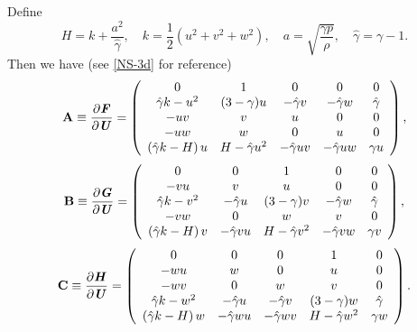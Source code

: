 \documentclass[review]{elsarticle}
\newcommand{\fr}{\frac}
\newcommand{\er}{\eqref}
\newcommand{\ga}{\gamma}
\newcommand{\bA}{\mathbf  A}
\newcommand{\bB}{\mathbf  B}
\newcommand{\bC}{\mathbf  C}
\newcommand{\pF}{\textbf{\emph{F}}}
\newcommand{\pG}{\textbf{\emph{G}}}
\newcommand{\pH}{\textbf{\emph{H}}}
\newcommand{\pU}{\textbf{\emph{U}}}
\newcommand{\pat}{\partial}
\begin{document}
Define
\begin{equation}\label{H-k-gamma-3d}
  H = k + \fr{a^2}{\hat \ga}, \quad
  k = \fr{1}{2} (u^2 + v^2 + w^2), \quad
  a = \sqrt{ \fr{\ga p}{\rho} }, \quad
  \hat \ga = \ga -1.
\end{equation}
Then we have (see \er{NS-3d} for reference)
\begin{equation}\label{A-3d}
  \bA \equiv \fr{\pat \pF}{\pat \pU} =
  \left(
    \begin{array}{ccccc}
      0 & 1 & 0 & 0 & 0 \\
      \hat \ga k - u^2 & (3-\ga) u & -\hat \ga v & -\hat \ga w & \hat \ga \\
      -uv & v & u & 0 & 0 \\
      -uw & w & 0 & u & 0 \\
      \left(\hat \ga k- H \right) u & H - \hat \ga u^2 & -\hat \ga uv & -\hat \ga uw & \ga u \\
    \end{array}
  \right),
\end{equation}
\begin{equation}\label{B-3d}
  \bB \equiv \fr{\pat \pG}{\pat \pU} =
  \left(
    \begin{array}{ccccc}
      0 & 0 & 1 & 0 & 0 \\
      -vu & v & u & 0 & 0 \\
      \hat \ga k - v^2 & -\hat \ga u & (3-\ga) v & -\hat \ga w & \hat \ga \\
      -vw & 0 & w & v & 0 \\
      \left(\hat \ga k- H \right) v & -\hat \ga vu & H - \hat \ga v^2 & -\hat \ga vw & \ga v \\
    \end{array}
  \right),
\end{equation}
\begin{equation}\label{C-3d}
  \bC \equiv \fr{\pat \pH}{\pat \pU} =
  \left(
    \begin{array}{ccccc}
      0 & 0 & 0 & 1 & 0 \\
      -wu & w & 0 & u & 0 \\
      -wv & 0 & w & v & 0 \\
      \hat \ga k - w^2 & -\hat \ga u & -\hat \ga v & (3-\ga) w &\hat \ga \\
      \left(\hat \ga k- H \right) w & -\hat \ga wu & -\hat \ga wv & H - \hat \ga w^2 &\ga w \\
    \end{array}
  \right).
\end{equation}
\end{document}

